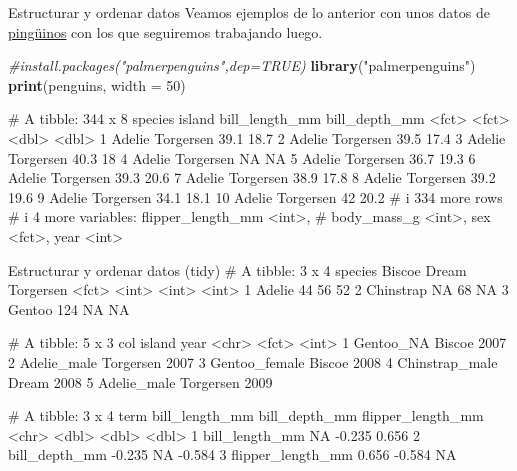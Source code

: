 \documentclass[
  ignorenonframetext,
  aspectratio=169]{beamer}
\newenvironment{Shaded}{\begin{snugshade}}{\end{snugshade}}
\newcommand{\AttributeTok}[1]{\textcolor[rgb]{0.13,0.29,0.53}{#1}}
\newcommand{\CommentTok}[1]{\textcolor[rgb]{0.56,0.35,0.01}{\textit{#1}}}
\newcommand{\DecValTok}[1]{\textcolor[rgb]{0.00,0.00,0.81}{#1}}
\newcommand{\FunctionTok}[1]{\textcolor[rgb]{0.13,0.29,0.53}{\textbf{#1}}}
\newcommand{\NormalTok}[1]{#1}
\newcommand{\StringTok}[1]{\textcolor[rgb]{0.31,0.60,0.02}{#1}}
\let\oldverbatim\verbatim
\let\endoldverbatim\endverbatim
\renewenvironment{verbatim}{\tiny\oldverbatim}{\endoldverbatim}
\begin{document}
\begin{frame}[fragile]{Estructurar y ordenar datos}
\label{estructurar-y-ordenar-datos}
Veamos ejemplos de lo anterior con unos datos de
\href{https://allisonhorst.github.io/palmerpenguins/}{pingüinos} con los
que seguiremos trabajando luego.

\begin{Shaded}
\begin{Highlighting}[]
\CommentTok{\#install.packages("palmerpenguins",dep=TRUE)}
\FunctionTok{library}\NormalTok{(}\StringTok{"palmerpenguins"}\NormalTok{)}
\FunctionTok{print}\NormalTok{(penguins, }\AttributeTok{width =} \DecValTok{50}\NormalTok{)}
\end{Highlighting}
\end{Shaded}

\begin{verbatim}
# A tibble: 344 x 8
   species island    bill_length_mm bill_depth_mm
   <fct>   <fct>              <dbl>         <dbl>
 1 Adelie  Torgersen           39.1          18.7
 2 Adelie  Torgersen           39.5          17.4
 3 Adelie  Torgersen           40.3          18  
 4 Adelie  Torgersen           NA            NA  
 5 Adelie  Torgersen           36.7          19.3
 6 Adelie  Torgersen           39.3          20.6
 7 Adelie  Torgersen           38.9          17.8
 8 Adelie  Torgersen           39.2          19.6
 9 Adelie  Torgersen           34.1          18.1
10 Adelie  Torgersen           42            20.2
# i 334 more rows
# i 4 more variables: flipper_length_mm <int>,
#   body_mass_g <int>, sex <fct>, year <int>
\end{verbatim}
\end{frame}

\begin{frame}[fragile]{Estructurar y ordenar datos (tidy)}
\label{estructurar-y-ordenar-datos-tidy-1}
\begin{verbatim}
# A tibble: 3 x 4
  species   Biscoe Dream Torgersen
  <fct>      <int> <int>     <int>
1 Adelie        44    56        52
2 Chinstrap     NA    68        NA
3 Gentoo       124    NA        NA
\end{verbatim}

\begin{verbatim}
# A tibble: 5 x 3
  col            island     year
  <chr>          <fct>     <int>
1 Gentoo_NA      Biscoe     2007
2 Adelie_male    Torgersen  2007
3 Gentoo_female  Biscoe     2008
4 Chinstrap_male Dream      2008
5 Adelie_male    Torgersen  2009
\end{verbatim}

\begin{verbatim}
# A tibble: 3 x 4
  term              bill_length_mm bill_depth_mm flipper_length_mm
  <chr>                      <dbl>         <dbl>             <dbl>
1 bill_length_mm            NA            -0.235             0.656
2 bill_depth_mm             -0.235        NA                -0.584
3 flipper_length_mm          0.656        -0.584            NA    
\end{verbatim}
\end{frame}
\end{document}
